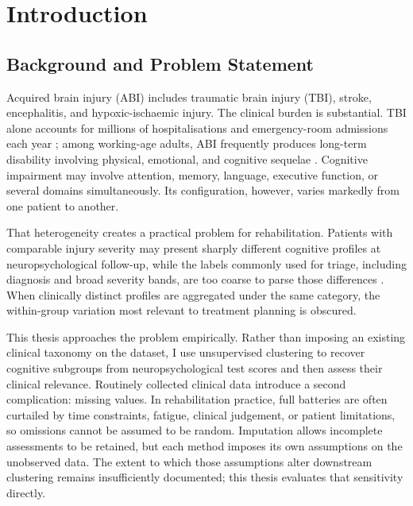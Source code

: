 
\chapter{Introduction}\label{Chapter1}


\section{Background and Problem Statement}

Acquired brain injury (ABI) includes traumatic brain injury (TBI), stroke, encephalitis, and hypoxic-ischaemic injury. The clinical burden is substantial. TBI alone accounts for millions of hospitalisations and emergency-room admissions each year \parencite{maas2017traumatic, brazinova2021epidemiology}; among working-age adults, ABI frequently produces long-term disability involving physical, emotional, and cognitive sequelae \parencite{corrigan2010epidemiology}. Cognitive impairment may involve attention, memory, language, executive function, or several domains simultaneously. Its configuration, however, varies markedly from one patient to another.

That heterogeneity creates a practical problem for rehabilitation. Patients with comparable injury severity may present sharply different cognitive profiles at neuropsychological follow-up, while the labels commonly used for triage, including diagnosis and broad severity bands, are too coarse to parse those differences \parencite{saatman2008classification}. When clinically distinct profiles are aggregated under the same category, the within-group variation most relevant to treatment planning is obscured.

This thesis approaches the problem empirically. Rather than imposing an existing clinical taxonomy on the dataset, I use unsupervised clustering to recover cognitive subgroups from neuropsychological test scores and then assess their clinical relevance. Routinely collected clinical data introduce a second complication: missing values. In rehabilitation practice, full batteries are often curtailed by time constraints, fatigue, clinical judgement, or patient limitations, so omissions cannot be assumed to be random. Imputation allows incomplete assessments to be retained, but each method imposes its own assumptions on the unobserved data. The extent to which those assumptions alter downstream clustering remains insufficiently documented; this thesis evaluates that sensitivity directly.

